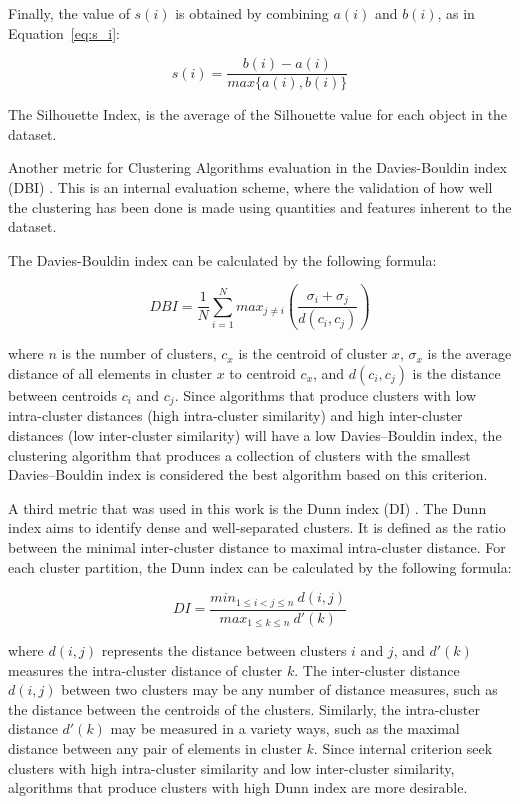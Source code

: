 \documentclass[conference]{IEEEtran}
\begin{document}
	
	Finally, the value of $s(i)$ is obtained by combining $a(i)$ and $b(i)$, as in  Equation~\ref{eq:s_i}:
	
	
	\begin{equation} \label{eq:s_i}
	s(i) = \frac{b(i) - a(i)}{max\{a(i), b(i)\}}
	\end{equation}
	
	The Silhouette Index, is the average of the Silhouette value for each object in the dataset.
	
	Another metric for Clustering Algorithms evaluation in the Davies-Bouldin index (DBI) \cite{davies1979cluster}. This is an internal evaluation scheme, where the validation of how well the clustering has been done is made using quantities and features inherent to the dataset.
	
	The Davies-Bouldin index can be calculated by the following formula:
	
	\begin{equation} \label{eq:davies}
		DBI = \frac{1}{N} \sum_{i=1}^{N} max_{j \neq i} \left(\frac{\sigma_i + \sigma_j}{d(c_i, c_j)}\right)
	\end{equation}
	
	where $n$ is the number of clusters, $c_x$ is the centroid of cluster $x$, $\sigma_x$ is the average distance of all elements in cluster $x$ to centroid $c_x$, and $d(c_i, c_j)$ is the distance between centroids $c_i$ and $c_j$. Since algorithms that produce clusters with low intra-cluster distances (high intra-cluster similarity) and high inter-cluster distances (low inter-cluster similarity) will have a low Davies–Bouldin index, the clustering algorithm that produces a collection of clusters with the smallest Davies–Bouldin index is considered the best algorithm based on this criterion.
	
	
	A third metric that was used in this work is the Dunn index (DI) \cite{dunn1973fuzzy}. The Dunn index aims to identify dense and well-separated clusters. It is defined as the ratio between the minimal inter-cluster distance to maximal intra-cluster distance. For each cluster partition, the Dunn index can be calculated by the following formula:
	
	\begin{equation} \label{eq:dunn}
		DI = \frac{min_{1\le i < j\le n}~d(i, j)}{max_{1\le k \le n}~d'(k)}
	\end{equation}
	
	
	where $d(i, j)$ represents the distance between clusters $i$ and $j$, and $d'(k)$ measures the intra-cluster distance of cluster $k$. The inter-cluster distance $d(i, j)$ between two clusters may be any number of distance measures, such as the distance between the centroids of the clusters. Similarly, the intra-cluster distance $d'(k)$ may be measured in a variety ways, such as the maximal distance between any pair of elements in cluster $k$. Since internal criterion seek clusters with high intra-cluster similarity and low inter-cluster similarity, algorithms that produce clusters with high Dunn index are more desirable.
	
\end{document}
